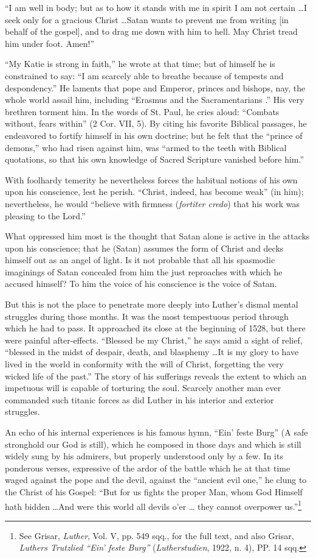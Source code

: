 “I am well in body; but as to how it stands with me in spirit I am not
certain \dots I seek only for a gracious Christ \dots Satan wants to prevent
me from writing [in behalf of the gospel], and to drag me down with him
to hell. May Christ tread him under foot. Amen!”

“My Katie is strong in faith,” he wrote at that time; but of himself he is
constrained to say: “I am scarcely able to breathe because of tempests and
despondency.” He laments that pope and Emperor, princes and bishops,
nay, the whole world assail him, including “Erasmus and the Sacramentarians
.” His very brethren torment him. In the words of St. Paul, he cries
aloud: “Combats without, fears within” (2 Cor. VII, 5). By citing his
favorite Biblical passages, he endeavored to fortify himself in his own doctrine;
but he felt that the “prince of demons,” who had risen against him,
was “armed to the teeth with Biblical quotations, so that his own knowledge
of Sacred Scripture vanished before him.”

With foolhardy temerity he nevertheless forces the habitual notions of
his own upon his conscience, lest he perish. “Christ, indeed, has become
weak” (in him); nevertheless, he would “believe with firmness (\textit{fortiter
credo}) that his work was pleasing to the Lord.”

What oppressed him most is the thought that Satan alone is
active in the attacks upon his conscience; that he (Satan) assumes
the form of Christ and decks himself out as an angel of light. Is it
not probable that all his spasmodic imaginings of Satan concealed
from him the just reproaches with which he accused himself? To
him the voice of his conscience is the voice of Satan.

But this is not the place to penetrate more deeply into Luther’s
dismal mental struggles during those months. It was the most tempestuous
period through which he had to pass. It approached its close
at the beginning of 1528, but there were painful after-effects.
“Blessed be my Christ,” he says amid a sight of relief, “blessed in the
midst of despair, death, and blasphemy \dots It is my glory to have
lived in the world in conformity with the will of Christ, forgetting
the very wicked life of the past.” The story of his sufferings reveals
the extent to which an impetuous will is capable of torturing the
soul. Scarcely another man ever commanded such titanic forces as
did Luther in his interior and exterior struggles.

An echo of his internal experiences is his famous hymn, “Ein’
feste Burg” (A safe stronghold our God is still), which he composed
in those days and which is still widely sung by his admirers, but
properly understood only by a few. In its ponderous verses, expressive
of the ardor of the battle which he at that time waged against the
pope and the devil, against the “ancient evil one,” he clung to the
Christ of his Gospel: “But for us fights the proper Man, whom God
Himself hath bidden \dots And were this world all devils o'er \dots
they cannot overpower us.”\footnote{See Grisar, \textit{Luther}, Vol. V, pp. 549 sqq., for the full text, and also Grisar, \textit{Luthers
Trutzlied “Ein’ feste Burg”} (\textit{Lutherstudien}, 1922, n. 4), PP. 14 sqq.}

